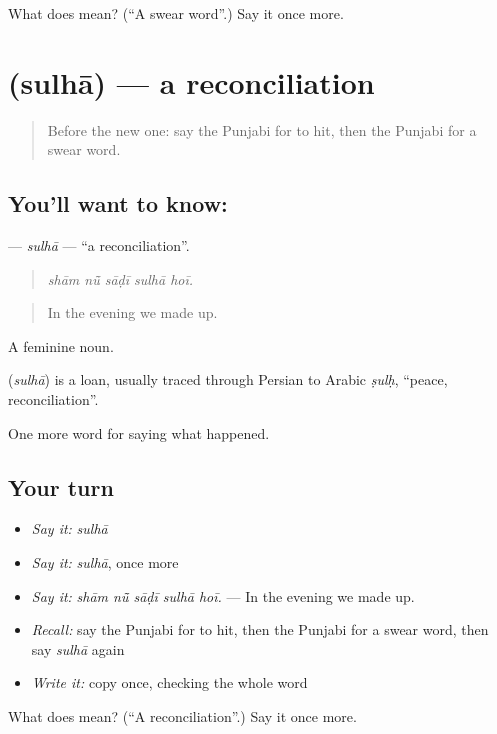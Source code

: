 \begin{tcolorbox}[breakable,colback=teal!4,colframe=teal!35!black,title={Before you move on}]
What does  mean? (\textquotedblleft{}A swear word\textquotedblright{}.) Say it once more.
\end{tcolorbox}
\section[\texorpdfstring{\pa{ਸੁਲ੍ਹਾ} (sulhā)}{ਸੁਲ੍ਹਾ (sulhā)}]{ (sulhā) — a reconciliation}

\label{lesson:PA-C316-sulha}



\begin{quote}
Before the new one: say the Punjabi for to hit, then the Punjabi for a swear word.
\end{quote}

\subsection*{You'll want to know: }
\textbf{} — \emph{sulhā} — \textquotedblleft{}a reconciliation\textquotedblright{}.

\begin{quote}
    
\end{quote}

\begin{quote}
\emph{shām nū̃ sāḍī sulhā hoī.}
\end{quote}

\begin{quote}
In the evening we made up.
\end{quote}

A feminine noun.

\begin{cousinweb}
\textbf{} (\emph{sulhā}) is a loan, usually traced through Persian to Arabic \emph{ṣulḥ}, \textquotedblleft{}peace, reconciliation\textquotedblright{}.
\end{cousinweb}

\begin{grammarlens}[title={What you've built}]
One more word for saying what happened.
\end{grammarlens}

\subsection*{Your turn}
\begin{itemize}
\raggedright
  \item \emph{Say it:} \emph{sulhā}
  \item \emph{Say it:} \emph{sulhā}, once more
  \item \emph{Say it:} \emph{shām nū̃ sāḍī sulhā hoī.} — In the evening we made up.
  \item \emph{Recall:} say the Punjabi for to hit, then the Punjabi for a swear word, then say \emph{sulhā} again
  \item \emph{Write it:} copy \textbf{} once, checking the whole word
\end{itemize}

\begin{tcolorbox}[breakable,colback=teal!4,colframe=teal!35!black,title={Before you move on}]
What does  mean? (\textquotedblleft{}A reconciliation\textquotedblright{}.) Say it once more.
\end{tcolorbox}

